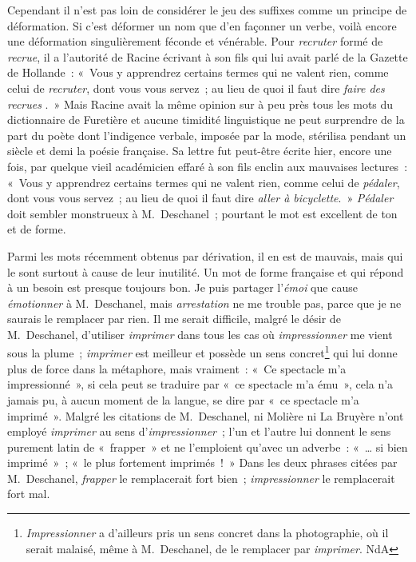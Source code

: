 \documentclass[french,twoside]{book} %
\begin{document}
Cependant il n’est pas loin de considérer le jeu des suffixes comme un principe de déformation. Si c’est déformer un nom que d’en façonner un verbe, voilà encore une déformation singulièrement féconde et vénérable. Pour {\itshape recruter} formé de {\itshape recrue}, il a l’autorité de Racine écrivant à son fils qui lui avait parlé de la Gazette de Hollande : « Vous y apprendrez certains termes qui ne valent rien, comme celui de {\itshape recruter}, dont vous vous servez ; au lieu de quoi il faut dire {\itshape faire des recrues} . » Mais Racine avait la même opinion sur à peu près tous les mots du dictionnaire de Furetière et aucune timidité linguistique ne peut surprendre de la part du poète dont l’indigence verbale, imposée par la mode, stérilisa pendant un siècle et demi la poésie française. Sa lettre fut peut-être écrite hier, encore une fois, par quelque vieil académicien effaré à son fils enclin aux mauvaises lectures : « Vous y apprendrez certains termes qui ne valent rien, comme celui de {\itshape pédaler}, dont vous vous servez ; au lieu de quoi il faut dire {\itshape aller à bicyclette}. » {\itshape Pédaler} doit sembler monstrueux à M. Deschanel ; pourtant le mot est excellent de ton et de forme.\par
Parmi les mots récemment obtenus par dérivation, il en est de mauvais, mais qui le sont surtout à cause de leur inutilité. Un mot de forme française et qui répond à un besoin est presque toujours bon. Je puis partager l’{\itshape émoi} que cause {\itshape émotionner} à M. Deschanel, mais {\itshape arrestation} ne me trouble pas, parce que je ne saurais le remplacer par rien. Il me serait difficile, malgré le désir de M. Deschanel, d’utiliser {\itshape imprimer} dans tous les cas où {\itshape impressionner} me vient sous la plume ; {\itshape imprimer} est meilleur et possède un sens concret\footnote{ {\itshape Impressionner} a d’ailleurs pris un sens concret dans la photographie, où il serait malaisé, même à M. Deschanel, de le remplacer par {\itshape imprimer}. NdA} qui lui donne plus de force dans la métaphore, mais vraiment : « Ce spectacle m’a impressionné », si cela peut se traduire par « ce spectacle m’a ému », cela n’a jamais pu, à aucun moment de la langue, se dire par « ce spectacle m’a imprimé ». Malgré les citations de M. Deschanel, ni Molière ni La Bruyère n’ont employé {\itshape imprimer} au sens d’{\itshape impressionner} ; l’un et l’autre lui donnent le sens purement latin de « frapper » et ne l’emploient qu’avec un adverbe : « … si bien imprimé » ; « le plus fortement imprimés ! » Dans les deux phrases citées par M. Deschanel, {\itshape frapper} le remplacerait fort bien ; {\itshape impressionner} le remplacerait fort mal.\par
\end{document}
